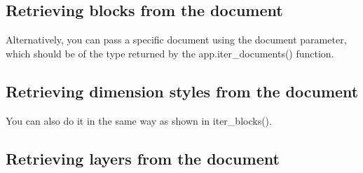 \documentclass[a4paper,10pt,english]{sphinxmanual}
\begin{document}
\subsection{Retrieving blocks from the document}
\label{\detokenize{usage:retrieving-blocks-from-the-document}}
\begin{sphinxVerbatim}[commandchars=\\\{\}]
  
\end{sphinxVerbatim}

\sphinxAtStartPar
Alternatively, you can pass a specific document using the document parameter, which should be of the type returned by the app.iter\_documents() function.

\begin{sphinxVerbatim}[commandchars=\\\{\}]
  \PYG{p}{[}\PYG{p}{]}
  \PYG{p}{[}\PYG{p}{]}  
  
\end{sphinxVerbatim}


\subsection{Retrieving dimension styles from the document}
\label{\detokenize{usage:retrieving-dimension-styles-from-the-document}}
\begin{sphinxVerbatim}[commandchars=\\\{\}]
  
\end{sphinxVerbatim}

\sphinxAtStartPar
You can also do it in the same way as shown in iter\_blocks().


\subsection{Retrieving layers from the document}
\label{\detokenize{usage:retrieving-layers-from-the-document}}
\begin{sphinxVerbatim}[commandchars=\\\{\}]
  
\end{sphinxVerbatim}
\end{document}
